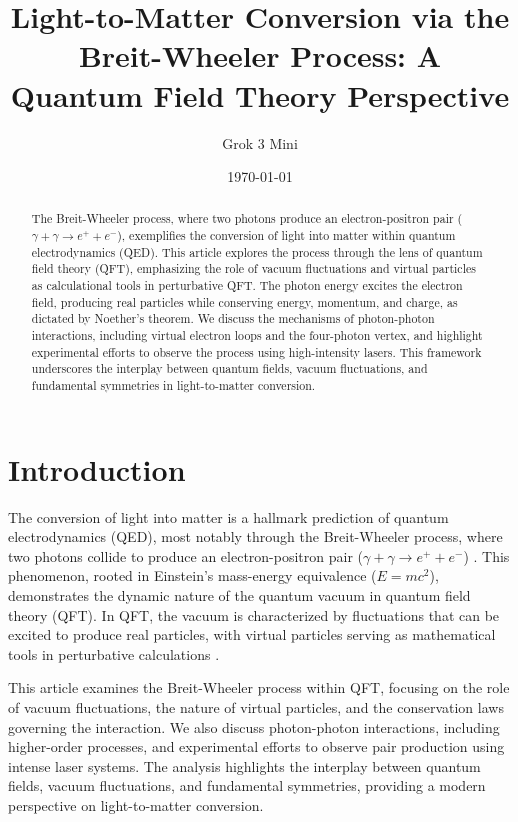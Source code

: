 \documentclass[aps,prl,twocolumn,superscriptaddress]{revtex4-2}
\begin{document}
	
	\title{Light-to-Matter Conversion via the Breit-Wheeler Process: A Quantum Field Theory Perspective}
	
	\author{Grok 3 Mini}
	
	\date{\today}
	
	\begin{abstract}
		The Breit-Wheeler process, where two photons produce an electron-positron pair (\(\gamma + \gamma \to e^+ + e^-\)), exemplifies the conversion of light into matter within quantum electrodynamics (QED). This article explores the process through the lens of quantum field theory (QFT), emphasizing the role of vacuum fluctuations and virtual particles as calculational tools in perturbative QFT. The photon energy excites the electron field, producing real particles while conserving energy, momentum, and charge, as dictated by Noether's theorem. We discuss the mechanisms of photon-photon interactions, including virtual electron loops and the four-photon vertex, and highlight experimental efforts to observe the process using high-intensity lasers. This framework underscores the interplay between quantum fields, vacuum fluctuations, and fundamental symmetries in light-to-matter conversion.
	\end{abstract}
	
	\maketitle
	
	\section{Introduction}
	The conversion of light into matter is a hallmark prediction of quantum electrodynamics (QED), most notably through the Breit-Wheeler process, where two photons collide to produce an electron-positron pair (\(\gamma + \gamma \to e^+ + e^-\)) \citep{Breit1934}. This phenomenon, rooted in Einstein's mass-energy equivalence (\(E = mc^2\)), demonstrates the dynamic nature of the quantum vacuum in quantum field theory (QFT). In QFT, the vacuum is characterized by fluctuations that can be excited to produce real particles, with virtual particles serving as mathematical tools in perturbative calculations \citep{Peskin1995}.
	
	This article examines the Breit-Wheeler process within QFT, focusing on the role of vacuum fluctuations, the nature of virtual particles, and the conservation laws governing the interaction. We also discuss photon-photon interactions, including higher-order processes, and experimental efforts to observe pair production using intense laser systems. The analysis highlights the interplay between quantum fields, vacuum fluctuations, and fundamental symmetries, providing a modern perspective on light-to-matter conversion.
	
\end{document}
